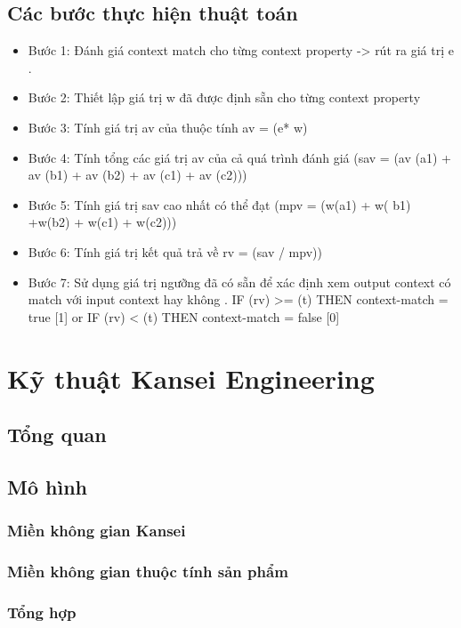 \subsection{Các bước thực hiện thuật toán }	
 \begin{itemize}
\item Bước 1: Đánh giá context match cho từng context property -> rút ra giá trị e . 
\item Bước 2: Thiết lập giá trị w đã được định sẵn cho từng context property
\item Bước 3: Tính giá trị av của thuộc tính av = (e* w)
\item Bước 4: Tính tổng các giá trị av của cả quá trình đánh giá (sav = (av (a1) + av (b1) + av (b2) + av (c1) + av (c2)))
\item Bước 5: Tính giá trị sav cao nhất có thể đạt (mpv = (w(a1) + w( b1) +w(b2) + w(c1) + w(c2)))
\item Bước 6: Tính giá trị kết quả trả về rv = (sav / mpv))
\item Bước 7: Sử dụng giá trị ngưỡng đã có sẵn để xác định xem output context có match với input context hay không . IF (rv) >= (t) THEN context-match = true [1] or IF (rv) < (t) THEN context-match = false [0]
 \end{itemize}
\section{Kỹ thuật Kansei Engineering}

\subsection{Tổng quan}

\subsection{Mô hình}
\subsubsection{Miền không gian Kansei}
\subsubsection{Miền không gian thuộc tính sản phẩm}
\subsubsection{Tổng hợp}




